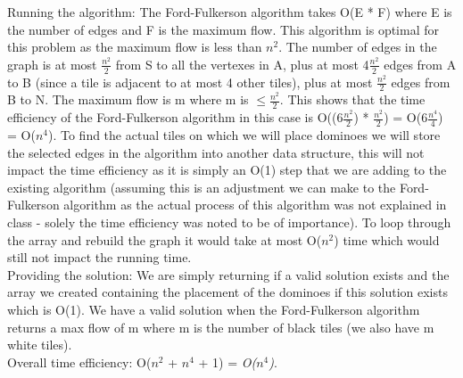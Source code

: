 \documentclass[12pt]{article}
\begin{document}
Running the algorithm: The Ford-Fulkerson algorithm takes O(E * F) where E is the number of edges and F is the maximum flow. This algorithm is optimal for this problem as the maximum flow is less than $n^2$. The number of edges in the graph is at most $\frac{n^2}{2}$ from S to all the vertexes in A, plus at most 4$\frac{n^2}{2}$ edges from A to B (since a tile is adjacent to at most 4 other tiles), plus at most $\frac{n^2}{2}$ edges from B to N. The maximum flow is m where m is $\le \frac{n^2}{2}$. This shows that the time efficiency of the Ford-Fulkerson algorithm in this case is O((6$\frac{n^2}{2}$) * $\frac{n^2}{2}$) = O(6$\frac{n^4}{4}$) = O($n^4$). To find the actual tiles on which we will place dominoes we will store the selected edges in the algorithm into another data structure, this will not impact the time efficiency as it is simply an O(1) step that we are adding to the existing algorithm (assuming this is an adjustment we can make to the Ford-Fulkerson algorithm as the actual process of this algorithm was not explained in class - solely the time efficiency was noted to be of importance). To loop through the array and rebuild the graph it would take at most O($n^2$) time which would still not impact the running time.\\

Providing the solution: We are simply returning if a valid solution exists and the array we created containing the placement of the dominoes if this solution exists which is O(1). We have a valid solution when the Ford-Fulkerson algorithm returns a max flow of m where m is the number of black tiles (we also have m white tiles).\\

Overall time efficiency: O($n^2$ + $n^4$ + 1) = \emph{O($n^4$)}.





 
\end{document}
